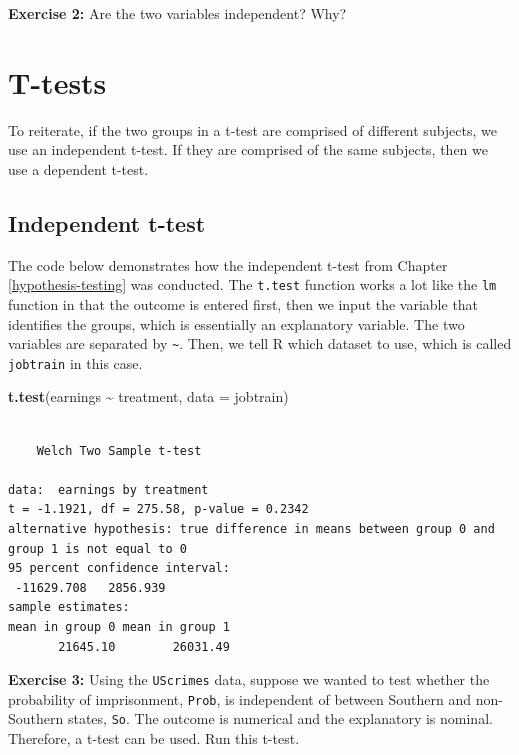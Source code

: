 \documentclass[
]{book}
\makeatletter
\newenvironment{Shaded}{\begin{snugshade}}{\end{snugshade}}
\newcommand{\AttributeTok}[1]{\textcolor[rgb]{0.27,0.27,0.27}{#1}}
\newcommand{\FunctionTok}[1]{\textcolor[rgb]{0.27,0.27,0.27}{\textbf{#1}}}
\newcommand{\NormalTok}[1]{#1}
\newcommand{\SpecialCharTok}[1]{\textcolor[rgb]{0.43,0.43,0.43}{\textbf{#1}}}
\newenvironment{kframe}{%
\medskip{}
\setlength{\fboxsep}{.8em}
 \def\at@end@of@kframe{}%
 \ifinner\ifhmode%
  \def\at@end@of@kframe{\end{minipage}}%
  \begin{minipage}{\columnwidth}%
 \fi\fi%
 \def\FrameCommand##1{\hskip\@totalleftmargin \hskip-\fboxsep
 \colorbox{shadecolor}{##1}\hskip-\fboxsep
     \hskip-\linewidth \hskip-\@totalleftmargin \hskip\columnwidth}%
 \MakeFramed {\advance\hsize-\width
   \@totalleftmargin\z@ \linewidth\hsize
   \@setminipage}}%
 {\par\unskip\endMakeFramed%
 \at@end@of@kframe}
\renewenvironment{Shaded}{\begin{kframe}}{\end{kframe}}
\newenvironment{rmdblock}[1]
  {\begin{shaded*}
  }
  {\end{shaded*}
  }
\newenvironment{learncheck}
  {\begin{rmdblock}{warning}}
  {\end{rmdblock}}
\makeatother
\begin{document}
\begin{learncheck}
\textbf{Exercise 2:} Are the two variables independent? Why?
\end{learncheck}

\hypertarget{t-tests}{%
\section{T-tests}\label{t-tests}}

To reiterate, if the two groups in a t-test are comprised of different subjects, we use an independent t-test. If they are comprised of the same subjects, then we use a dependent t-test.

\hypertarget{independent-t-test}{%
\subsection{Independent t-test}\label{independent-t-test}}

The code below demonstrates how the independent t-test from Chapter \ref{hypothesis-testing} was conducted. The \texttt{t.test} function works a lot like the \texttt{lm} function in that the outcome is entered first, then we input the variable that identifies the groups, which is essentially an explanatory variable. The two variables are separated by \texttt{\textasciitilde{}}. Then, we tell R which dataset to use, which is called \texttt{jobtrain} in this case.

\begin{Shaded}
\begin{Highlighting}[]
\FunctionTok{t.test}\NormalTok{(earnings }\SpecialCharTok{\textasciitilde{}}\NormalTok{ treatment, }\AttributeTok{data =}\NormalTok{ jobtrain)}
\end{Highlighting}
\end{Shaded}

\begin{verbatim}

    Welch Two Sample t-test

data:  earnings by treatment
t = -1.1921, df = 275.58, p-value = 0.2342
alternative hypothesis: true difference in means between group 0 and group 1 is not equal to 0
95 percent confidence interval:
 -11629.708   2856.939
sample estimates:
mean in group 0 mean in group 1 
       21645.10        26031.49 
\end{verbatim}

\begin{learncheck}
\textbf{Exercise 3:} Using the \texttt{UScrimes} data, suppose we wanted
to test whether the probability of imprisonment, \texttt{Prob}, is
independent of between Southern and non-Southern states, \texttt{So}.
The outcome is numerical and the explanatory is nominal. Therefore, a
t-test can be used. Run this t-test.
\end{learncheck}
\end{document}
